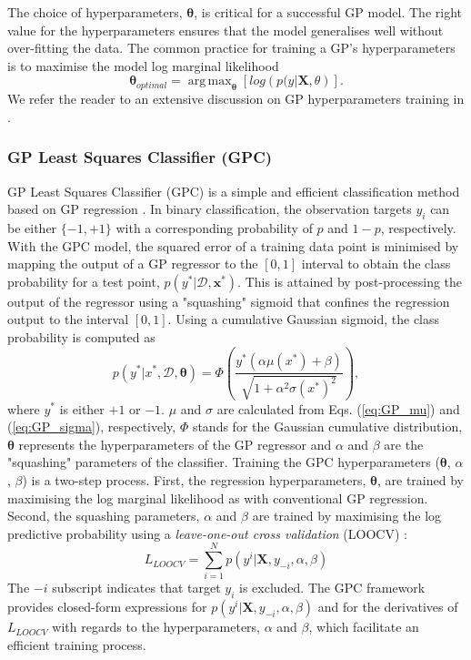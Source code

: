 \documentclass[shortAfour,sageh,times]{sagej_no_sage}
\DeclareMathOperator*{\argmax}{arg\,max}
\begin{document}
The choice of hyperparameters, $\boldsymbol{\theta}$, is critical for a successful GP model. The right value for the hyperparameters ensures that the model generalises well without over-fitting the data. The common practice for training a GP's hyperparameters is to maximise the model log marginal likelihood
		\begin{equation}\label{hypoerparam}
			\boldsymbol{\theta}_{optimal} = \argmax_{\boldsymbol{\theta}}\left[log \left(p(y|\boldsymbol{X},\theta \right) \right].    
		\end{equation}
We refer the reader to an extensive discussion on GP hyperparameters training in \citep{Rasmussen2006}.

\subsubsection{GP Least Squares Classifier (GPC)}	

GP Least Squares Classifier (GPC) is a simple and efficient classification method based on GP regression \citep{Rasmussen2006}. 
In binary classification, the observation targets $y_i$ can be either $\{-1,+1\}$ with a corresponding probability of $p$ and $1-p$, respectively. 
With the GPC model, the squared error of a training data point is minimised by mapping the output of a GP regressor to the $[0,1]$ 
interval to obtain the class probability for a test point, $p(y^*|\mathcal{D},\boldsymbol{x}^*)$. This is attained by post-processing the output of the regressor using a "squashing" sigmoid that confines the regression output to the interval $[0,1]$. Using a cumulative Gaussian sigmoid, the class probability is computed as
\begin{equation}\label{GPC}
p(y^*|x^*,\mathcal{D},\boldsymbol{\theta})=\Phi\left(\frac{y^*(\alpha\mu(x^*)+\beta)}{\sqrt{1+\alpha^2\sigma(x^*)^2}}\right),  
\end{equation}
where $y^*$ is either $+1$ or $-1$. $\mu$ and $\sigma$ are calculated from Eqs. (\ref{eq:GP_mu}) and (\ref{eq:GP_sigma}), respectively, $\Phi$ stands for the Gaussian cumulative distribution, $\boldsymbol{\theta}$ represents the hyperparameters of the GP regressor and $\alpha$ and $\beta$ are the "squashing" parameters of the classifier. Training the GPC hyperparameters ($\boldsymbol{\theta}$, $\alpha$, $\beta$) is a two-step process. First, the regression hyperparameters, $\boldsymbol{\theta}$,  are trained by maximising the log marginal likelihood as with conventional 
GP regression. Second, the  squashing parameters, $\alpha$ and $\beta$ are trained by maximising the log predictive probability using a \textit{leave-one-out cross validation} (LOOCV) \citep{Rasmussen2006}: 
\begin{equation}\label{GPC_LOOCV}
L_{LOOCV}=\sum_{i=1}^{N} p(y^i|\boldsymbol{X},y_{-i},\alpha,\beta)  
\end{equation}
The ${-i}$ subscript indicates that target $y_i$ is excluded. The GPC framework provides closed-form expressions for $p(y^i|\boldsymbol{X},y_{-i},\alpha,\beta)$ and for the derivatives of $L_{LOOCV}$ with regards to the hyperparameters, $\alpha$ and $\beta$, which facilitate an efficient training process.  
	
\end{document}
